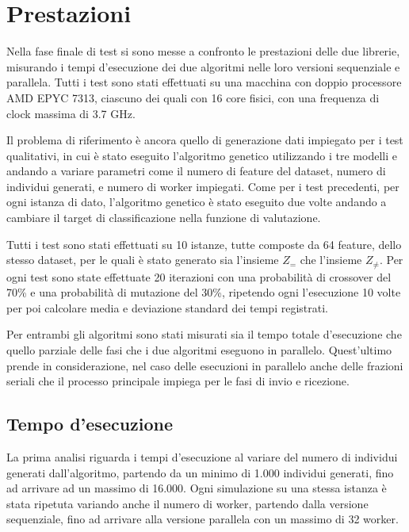 \section{Prestazioni}

Nella fase finale di test si sono messe a confronto le prestazioni delle due
librerie, misurando i tempi d'esecuzione dei due algoritmi nelle loro versioni
sequenziale e parallela. Tutti i test sono stati effettuati su una macchina con
doppio processore AMD EPYC 7313, ciascuno dei quali con 16 core fisici, con una
frequenza di clock massima di 3.7 GHz.

Il problema di riferimento è ancora quello di generazione dati impiegato per i
test qualitativi, in cui è stato eseguito l'algoritmo genetico utilizzando i
tre modelli e andando a variare parametri come il numero di feature del dataset,
numero di individui generati, e numero di worker impiegati. Come per i test
precedenti, per ogni istanza di dato, l'algoritmo genetico è stato eseguito due
volte andando a cambiare il target di classificazione nella funzione di
valutazione.

Tutti i test sono stati effettuati su 10 istanze, tutte composte da 64 feature,
dello stesso dataset, per le quali è stato generato sia l'insieme $Z_=$ che
l'insieme $Z_{\neq}$. Per ogni test sono state effettuate 20 iterazioni con una
probabilità di crossover del 70\% e una probabilità di mutazione del 30\%,
ripetendo ogni l'esecuzione 10 volte per poi calcolare media e deviazione
standard dei tempi registrati.

Per entrambi gli algoritmi sono stati misurati sia il tempo totale d'esecuzione
che quello parziale delle fasi che i due algoritmi eseguono in parallelo.
Quest'ultimo prende in considerazione, nel caso delle esecuzioni in parallelo
anche delle frazioni seriali che il processo principale impiega per le fasi di
invio e ricezione.

\subsection{Tempo d'esecuzione}

La prima analisi riguarda i tempi d'esecuzione al variare del numero
di individui generati dall'algoritmo, partendo da un minimo di 1.000 individui
generati, fino ad arrivare ad un massimo di 16.000. Ogni simulazione su una
stessa istanza è stata ripetuta variando anche il numero di worker, partendo
dalla versione sequenziale, fino ad arrivare alla versione parallela con un
massimo di 32 worker.

